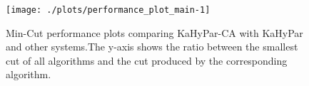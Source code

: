 \begin{figure}
\centering
\begin{knitrout}
\color{fgcolor}

{\centering \texttt{[image: ./plots/performance\_plot\_main-1]} 

}



\end{knitrout}
\caption{Min-Cut performance plots comparing KaHyPar-CA with KaHyPar and other systems.The y-axis shows the ratio between the smallest cut of all algorithms and the cut produced by the corresponding algorithm.}\label{fig:full}
\end{figure}
